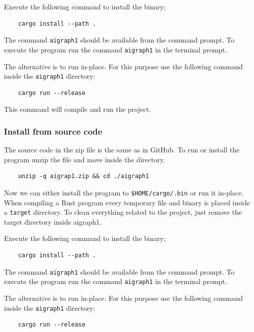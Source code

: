 Execute the following command to install the binary;

\begin{verbatim}
    cargo install --path .
\end{verbatim}

The command \texttt{aigraph1} should be available from the command prompt.
To execute the program run the command \texttt{aigraph1} in the terminal prompt.

The alternative is to run in-place. For this purpose use the following command inside the \texttt{aigraph1} directory:

\begin{verbatim}
    cargo run --release
\end{verbatim}

This command will compile and run the project.

\subsubsection{Install from source code}

The source code in the zip file is the same as in GitHub. To run or install the program unzip the file and move inside the
directory.


\begin{verbatim}
    unzip -q aigrap1.zip && cd ./aigraph1
\end{verbatim}


Now we can either install the program to \texttt{\$HOME/cargo/.bin} or run it in-place. When compiling a
Rust program every temporary file and binary is placed inside a \texttt{target} directory. To clean everything
related to the project, just remove the target directory inside aigraph1.

Execute the following command to install the binary;

\begin{verbatim}
    cargo install --path .
\end{verbatim}

The command \texttt{aigraph1} should be available from the command prompt.
To execute the program run the command \texttt{aigraph1} in the terminal prompt.

The alternative is to run in-place. For this purpose use the following command inside the \texttt{aigraph1} directory:

\begin{verbatim}
    cargo run --release
\end{verbatim}

